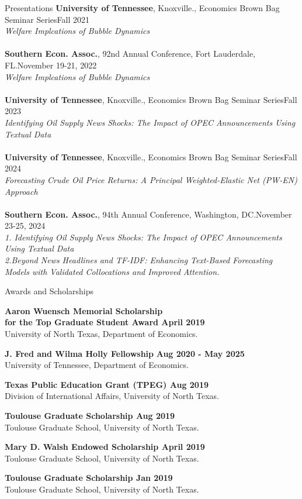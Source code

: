 \documentclass{resume}
\begin{document}
\begin{rSection}{Presentations}
\textbf{University of Tennessee}, Knoxville., Economics Brown Bag Seminar Series{\hfill{Fall 2021}\\}
{\sl Welfare Implcations of Bubble Dynamics}\\\\
\textbf{Southern Econ. Assoc.}, 92nd Annual Conference, Fort Lauderdale, FL.{\hfill{November 19-21, 2022}\\}
{\sl Welfare Implcations of Bubble Dynamics}\\\\
\textbf{University of Tennessee}, Knoxville., Economics Brown Bag Seminar Series{\hfill{Fall 2023}\\}
{\sl Identifying Oil Supply News Shocks: The Impact of OPEC Announcements Using Textual Data}\\\\
\textbf{University of Tennessee}, Knoxville., Economics Brown Bag Seminar Series{\hfill{Fall 2024}\\}
{\sl Forecasting Crude Oil Price Returns: A Principal Weighted-Elastic Net (PW-EN) Approach}\\\\
\textbf{Southern Econ. Assoc.}, 94th Annual Conference, Washington, DC.{\hfill{November 23-25, 2024}\\}
{\sl 1. Identifying Oil Supply News Shocks: The Impact of OPEC Announcements Using Textual Data\\
2.Beyond News Headlines and TF-IDF: Enhancing Text-Based Forecasting Models with Validated Collocations and Improved Attention.}\\
\end{rSection}

\begin{rSection}{Awards and Scholarships} 

    \textbf{Aaron Wuensch Memorial Scholarship\\for the Top Graduate Student Award  \hfill April 2019}\\
    University of North Texas, Department of Economics.
        
    \textbf{J. Fred and Wilma Holly Fellowship} {\hfill{\bf Aug 2020 - May 2025}\\}
     University of Tennessee, Department of Economics.
        
    \textbf{Texas Public Education Grant (TPEG) \hfill Aug 2019}\\
    Division of International Affairs, University of North Texas.
        
    \textbf{Toulouse Graduate Scholarship \hfill Aug 2019}\\
    Toulouse Graduate School, University of North Texas.
        
    \textbf{Mary D. Walsh Endowed Scholarship \hfill April 2019}\\
    Toulouse Graduate School, University of North Texas.
        
    \textbf{Toulouse Graduate Scholarship \hfill Jan 2019}\\
    Toulouse Graduate School, University of North Texas.
        
    \end{rSection}
\end{document}
